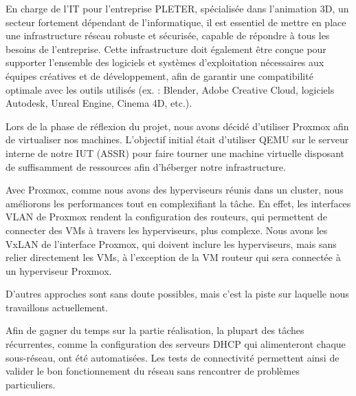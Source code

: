 \documentclass[../file.tex]{subfiles}
\begin{document}
En charge de l'IT pour l'entreprise PLETER, spécialisée dans l'animation 3D, un secteur fortement dépendant de l'informatique, il est essentiel de mettre en place une infrastructure réseau robuste et sécurisée, capable de répondre à tous les besoins de l'entreprise. Cette infrastructure doit également être conçue pour supporter l'ensemble des logiciels et systèmes d'exploitation nécessaires aux équipes créatives et de développement, afin de garantir une compatibilité optimale avec les outils utilisés (ex. : Blender, Adobe Creative Cloud, logiciels Autodesk, Unreal Engine, Cinema 4D, etc.).

\newline
Lors de la phase de réflexion du projet, nous avons décidé d'utiliser Proxmox afin de virtualiser nos machines. L'objectif initial était d'utiliser QEMU sur le serveur interne de notre IUT (ASSR) pour faire tourner une machine virtuelle disposant de suffisamment de ressources afin d'héberger notre infrastructure.

Avec Proxmox, comme nous avons des hyperviseurs réunis dans un cluster, nous améliorons les performances tout en complexifiant la tâche. En effet, les interfaces VLAN de Proxmox rendent la configuration des routeurs, qui permettent de connecter des VMs à travers les hyperviseurs, plus complexe. Nous avons les VxLAN de l'interface Proxmox, qui doivent inclure les hyperviseurs, mais sans relier directement les VMs, à l'exception de la VM routeur qui sera connectée à un hyperviseur Proxmox.

D'autres approches sont sans doute possibles, mais c'est la piste sur laquelle nous travaillons actuellement.

Afin de gagner du temps sur la partie réalisation, la plupart des tâches récurrentes, comme la configuration des serveurs DHCP qui alimenteront chaque sous-réseau, ont été automatisées. Les tests de connectivité permettent ainsi de valider le bon fonctionnement du réseau sans rencontrer de problèmes particuliers.
\end{document}
